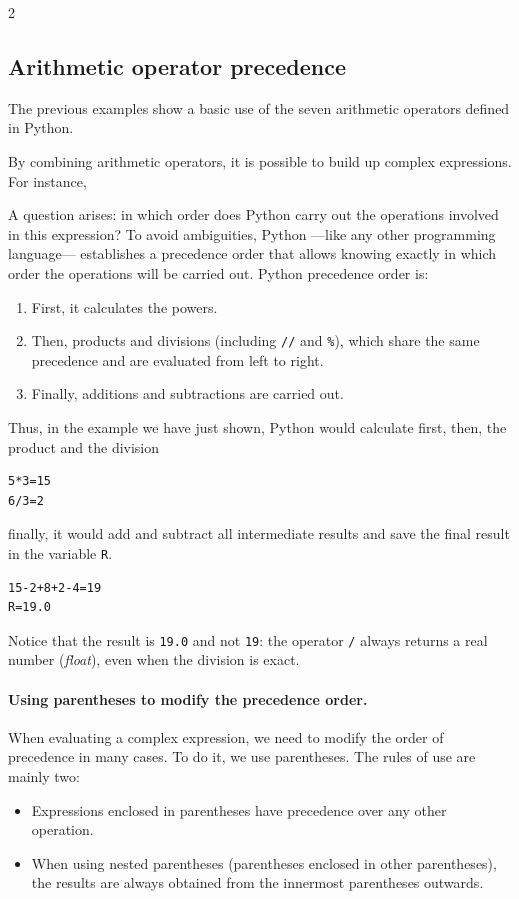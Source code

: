 \begin{paracol}{2}
\subsection{Arithmetic operator precedence}
The previous examples show a basic use of the seven arithmetic operators defined in Python.  
 
By combining arithmetic operators, it is possible to build up complex expressions. For instance,

A question arises: in which order does Python carry out the operations involved in this expression? To avoid ambiguities, Python ---like any other programming language--- establishes a precedence order that allows knowing exactly in which order the operations will be carried out. Python precedence order is:
\begin{enumerate}
\item First, it calculates the powers.
\item Then, products and divisions (including \texttt{//} and \texttt{\%}), which share the same precedence and are evaluated from left to right.
\item Finally, additions and subtractions are carried out. 
\end{enumerate} 

Thus, in the example we have just shown, Python would calculate first,
then, the product and the division
\begin{verbatim}
5*3=15
6/3=2
\end{verbatim}
finally, it would add and subtract all intermediate results and save the final result in the variable \texttt{R}.
\begin{verbatim}
15-2+8+2-4=19
R=19.0
\end{verbatim}
Notice that the result is \texttt{19.0} and not \texttt{19}: the operator \texttt{/} always returns a real number (\emph{float}), even when the division is exact.

\paragraph{Using parentheses to modify the precedence order.}
When evaluating a complex expression, we need to modify the order of precedence in many cases. To do it, we use parentheses. The rules of use are mainly two:
\begin{itemize}
\item Expressions enclosed in parentheses have precedence over any other operation.
\item When using nested parentheses (parentheses enclosed in other parentheses), the results are always obtained from the innermost parentheses outwards.
\end{itemize}


\end{paracol}
